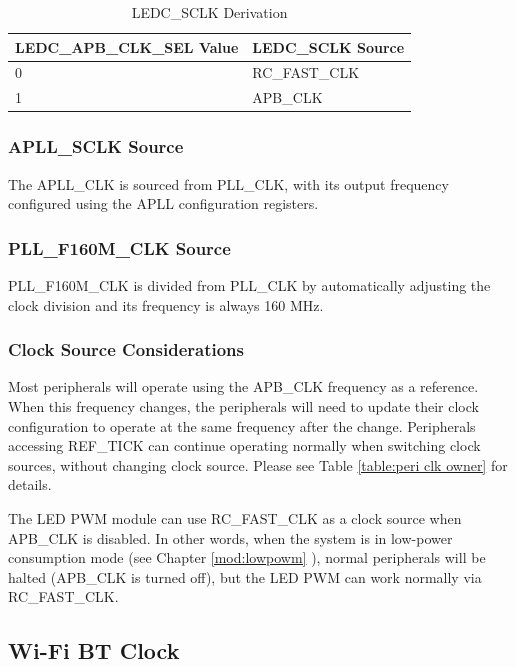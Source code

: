 \documentclass[main\_\_EN.tex]{subfiles}
\begin{document}
\begin{longtable}[c]{|l|l|}
 \caption{LEDC\_SCLK Derivation}
    \label{table:led_sclk}
        \\\hline
        \rowcolor{lightgray}
        LEDC\_APB\_CLK\_SEL Value & LEDC\_SCLK Source  \\
        \hline
        0 & RC\_FAST\_CLK \\
        \hline
        1 & APB\_CLK \\
        \hline
\end{longtable}

\subsubsection{APLL\_SCLK Source}

The APLL\_CLK is sourced from PLL\_CLK, with its output frequency configured using the APLL configuration registers.

\subsubsection{PLL\_F160M\_CLK Source}

PLL\_F160M\_CLK is divided from PLL\_CLK by automatically adjusting the clock division and its frequency is always 160 MHz. 

\subsubsection{Clock Source Considerations}

Most peripherals will operate using the APB\_CLK frequency as a reference. When this frequency changes, the peripherals will need to update their clock configuration to operate at the same frequency after the change. Peripherals accessing REF\_TICK can continue operating normally when switching clock sources, without changing clock source. Please see Table \ref{table:peri clk owner} for details.

The LED PWM module can use RC\_FAST\_CLK as a clock source when APB\_CLK is disabled. In other words, when the system is in low-power consumption mode (see Chapter \ref{mod:lowpowm} \textit{}), normal peripherals will be halted (APB\_CLK is turned off),  but the LED PWM can work normally via RC\_FAST\_CLK.

\subsection{Wi-Fi BT Clock}
\end{document}
